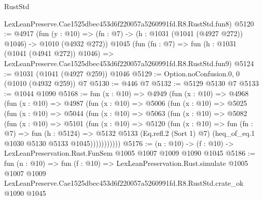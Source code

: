 \begin{lexlean}{RustStd}
\begin{coremodule}
    LexLeanPreserve.Cae1525dbec453d6f220057a5260991fd.R8.RustStd.fun8)
@5120 := @4917
    (fun (y : @10) => (fn : @7) -> (h : @1031 (@1041 (@4927 @272)) @1046) -> @1010 (@4932 @272))
    @1045
    (fun (fn : @7) =>
    fun (h : @1031 (@1041 (@4941 @272)) @1046) =>
    LexLeanPreserve.Cae1525dbec453d6f220057a5260991fd.R8.RustStd.fun9)
@5124 := @1031 (@1041 (@4927 @259)) @1046
@5129 := Option.noConfusion.{0, 0} (@1010 (@4932 @259)) @7
@5130 := @446 @7
@5132 := @5129 @5130 @7
@5133 := @1044 @1090
@5168 := fun (x : @10) =>
  @4949
    (fun (x : @10) =>
    @4968
      (fun (x : @10) =>
      @4987
        (fun (x : @10) =>
        @5006
          (fun (x : @10) =>
          @5025
            (fun (x : @10) =>
            @5044
              (fun (x : @10) =>
              @5063
                (fun (x : @10) =>
                @5082
                  (fun (x : @10) =>
                  @5101
                    (fun (x : @10) =>
                    @5120
                      (fun (x : @10) =>
                      fun (fn : @7) =>
                      fun (h : @5124) =>
                      @5132
                        @5133
                        (Eq.refl.{2} (Sort 1) @7)
                        (heq_of_eq.{1} @1030 @5130 @5133 @1045)))))))))))
@5176 := (n : @10) -> (f : @10) -> LexLeanPreservation.Rust.FunSem @1005 @1007 @1009 @1090 @1045
@5186 := fun (n : @10) =>
  fun (f : @10) =>
  LexLeanPreservation.Rust.simulate
    @1005
    @1007
    @1009
    LexLeanPreserve.Cae1525dbec453d6f220057a5260991fd.R8.RustStd.crate_ok
    @1090
    @1045
\end{coremodule}
\end{lexlean}
